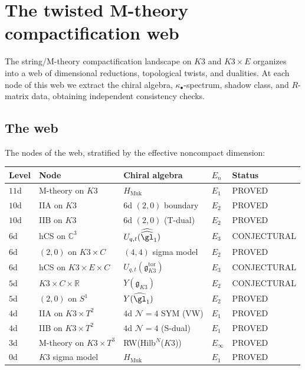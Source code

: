 \section{The twisted M-theory compactification web}
\label{sec:twisted-m-theory-web}

The string/M-theory compactification landscape on $K3$ and $K3 \times E$
organizes into a web of dimensional reductions, topological twists, and
dualities.  At each node of this web we extract the chiral algebra,
$\kappa_\bullet$-spectrum, shadow class, and $R$-matrix data, obtaining
independent consistency checks.

\subsection{The web}
\label{sec:compactification-web}

The nodes of the web, stratified by the effective noncompact dimension:

\begin{center}
\renewcommand{\arraystretch}{1.3}
\begin{tabular}{lllll}
\hline
\textbf{Level} & \textbf{Node} & \textbf{Chiral algebra} & \textbf{$E_n$} & \textbf{Status} \\
\hline
$11$d & M-theory on $K3$ & $H_{\mathrm{Muk}}$ & $E_1$ & PROVED \\
$10$d & IIA on $K3$ & $6$d $(2{,}0)$ boundary & $E_2$ & PROVED \\
$10$d & IIB on $K3$ & $6$d $(2{,}0)$ (T-dual) & $E_2$ & PROVED \\
$6$d & hCS on $\mathbb{C}^3$ & $U_{q,t}(\widehat{\widehat{\gl}}_1)$ & $E_3$ & CONJECTURAL \\
$6$d & $(2{,}0)$ on $K3 \times C$ & $(4{,}4)$ sigma model & $E_2$ & PROVED \\
$6$d & hCS on $K3 \times E \times C$ & $U_{q,t}(\mathfrak{g}_{K3}^{\mathrm{tor}})$ & $E_3$ & CONJECTURAL \\
$5$d & $K3 \times C \times \mathbb{R}$ & $Y(\mathfrak{g}_{K3})$ & $E_2$ & CONJECTURAL \\
$5$d & $(2{,}0)$ on $S^1$ & $Y(\widehat{\gl}_1)$ & $E_2$ & PROVED \\
$4$d & IIA on $K3 \times T^2$ & $4$d $\mathcal{N}=4$ SYM (VW) & $E_1$ & PROVED \\
$4$d & IIB on $K3 \times T^2$ & $4$d $\mathcal{N}=4$ (S-dual) & $E_1$ & PROVED \\
$3$d & M-theory on $K3 \times T^3$ & RW(Hilb$^N$($K3$)) & $E_\infty$ & PROVED \\
$0$d & $K3$ sigma model & $H_{\mathrm{Muk}}$ & $E_1$ & PROVED \\
\hline
\end{tabular}
\end{center}

